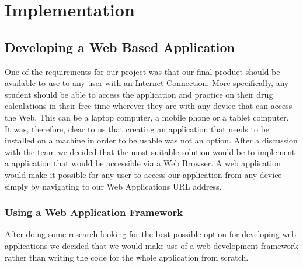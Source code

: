 \documentclass{l3proj}
\begin{document}
\chapter{Implementation}
\label{implementation}
\section{Developing a Web Based Application }
One of the requirements for our project was that our final product should be available to 
use to any user with an Internet Connection. More specifically, any student should be 
able to access the application and practice on their drug calculations in their free time 
wherever they are with any device that can access the Web. This can be a laptop 
computer, a mobile phone or a tablet computer. \\ 
It was, therefore, clear to us that creating an application that needs to be installed on a 
machine in order to be usable was not an option. After a discussion with the team we 
decided that the most suitable solution would be to implement a application that would be 
accessible via a Web Browser. A web application would make it possible for any user to 
access our application from any device simply by navigating to our Web Applications 
URL address. \\ 

\subsection {Using a Web Application Framework}
After doing some research looking for the best possible option for developing web 
applications we decided that we would make use of a web development framework 
rather than writing the code for the whole application from scratch.
\end{document}
